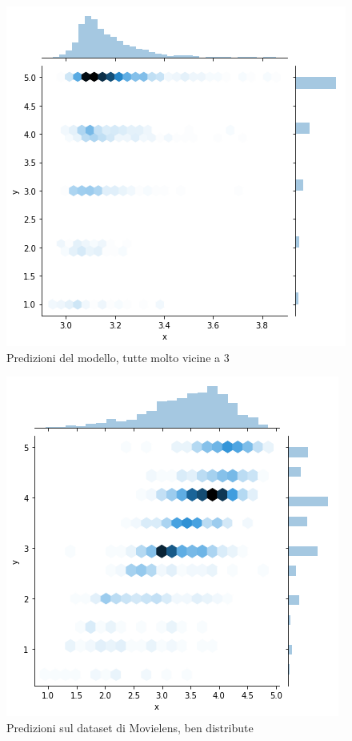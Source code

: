 \documentclass[hidelinks, 12pt]{article}
\begin{document}
\begin{figure}[H]
	\centering
	\includegraphics[scale=0.55]{images/07_05_predictions.png}
	\caption[Predizioni del modello, tutte molto vicine a 3]{Predizioni del modello, tutte molto vicine a 3}
	\label{fig:collab-preds}
\end{figure}

\begin{figure}[H]
\centering
\includegraphics[scale=0.55]{images/07_05_predictions_movielens.png}
\caption[Predizioni sul dataset di Movielens, ben distribute]{Predizioni sul dataset di Movielens, ben distribute}
\label{fig:collab-preds-movielens}
\end{figure}
\end{document}
